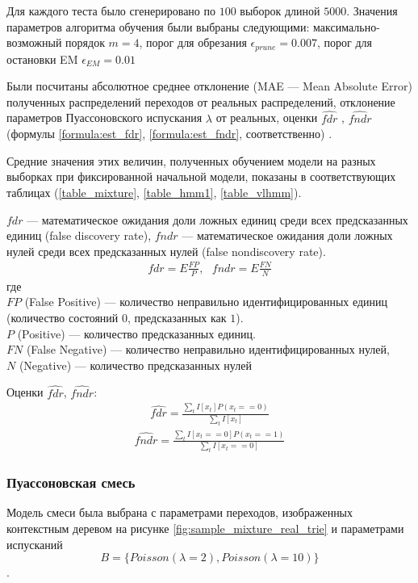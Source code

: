 \documentclass{matmex-diploma-custom}
\begin{document}
Для каждого теста было сгенерировано по $100$ выборок длиной $5000$.
Значения параметров алгоритма обучения были выбраны следующими: максимально-возможный порядок $m=4$, порог для обрезания $ \epsilon_{\textit{prune}} = 0.007$, порог для остановки EM $\epsilon_{\textit{EM}} =  0.01 $ 

Были посчитаны абсолютное среднее отклонение (MAE --- Mean Absolute Error) полученных распределений переходов от реальных распределений, отклонение параметров Пуассоновского испускания $\lambda$ от реальных, оценки $\hat{\textit{fdr}}$ ,  $\hat{\textit{fndr}}$ (формулы \ref{formula:est_fdr}, \ref{formula:est_fndr}, соответственно) \cite{Sun2009}.

Средние значения этих величин, полученных обучением модели на разных выборках при фиксированной начальной модели, показаны в соответствующих таблицах (\ref{table_mixture}, \ref{table_hmm1}, \ref{table_vlhmm}).

$\textit{fdr}$ --- математическое ожидания доли ложных единиц среди всех предсказанных единиц (false discovery rate),
$\textit{fndr}$ --- математическое ожидания доли ложных нулей среди всех предсказанных нулей  (false nondiscovery rate).
\begin{align}
\textit{fdr} = E\frac{\textit{FP}}{P}, 
~~~\textit{fndr} = E\frac{\textit{FN}}{N}
\end{align}
где 
\\$FP$ (False Positive) --- количество неправильно идентифицированных единиц (количество состояний $0$, предсказанных как $1$).
\\$P$ (Positive) --- количество предсказанных единиц.
\\$FN$ (False Negative) --- количество неправильно идентифицированных нулей,
\\$N$ (Negative) --- количество предсказанных нулей 

Оценки $\hat{\textit{fdr}}$, $\hat{\textit{fndr}}$:
\begin{align}
\hat{\textit{fdr}} = \frac{\sum_{t}{I[x_t]P(x_t==0)}}{\sum_{t}{I[x_t]}}
\label{formula:est_fdr}
\end{align}
\begin{align}
\hat{\textit{fndr}} = \frac{\sum_{t}{I[x_t==0]P(x_t==1)}}{\sum_{t}{I[x_t==0]}}
\label{formula:est_fndr}
\end{align}

\subsubsection{Пуассоновская смесь}
Модель смеси была выбрана с параметрами переходов, изображенных контекстным деревом на рисунке \ref{fig:sample_mixture_real_trie} и параметрами испусканий
$$B = \{\textit{Poisson}(\lambda=2), \textit{Poisson}(\lambda=10)\}$$.
\end{document}
